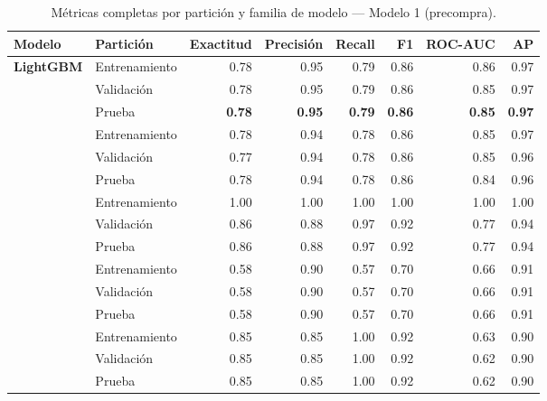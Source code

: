 \documentclass[11pt,letterpaper]{article}
\begin{document}
\begin{table}[h!]
\centering
\footnotesize
\caption{Métricas completas por partición y familia de modelo --- Modelo 1 (precompra).}
\label{tab:full_m1}
\begin{tabular}{@{}llrrrrrr@{}}
\toprule
Modelo & Partición & Exactitud & Precisión & Recall & F1 & ROC-AUC & AP \\
\midrule
\multirow{3}{*}{\textbf{LightGBM}}
  & Entrenamiento & 0.78 & 0.95 & 0.79 & 0.86 & 0.86 & 0.97 \\
  & Validación    & 0.78 & 0.95 & 0.79 & 0.86 & 0.85 & 0.97 \\
  & Prueba        & \textbf{0.78} & \textbf{0.95} & \textbf{0.79} & \textbf{0.86} & \textbf{0.85} & \textbf{0.97} \\
\addlinespace
\multirow{3}{*}{XGBoost}
  & Entrenamiento & 0.78 & 0.94 & 0.78 & 0.86 & 0.85 & 0.97 \\
  & Validación    & 0.77 & 0.94 & 0.78 & 0.86 & 0.85 & 0.96 \\
  & Prueba        & 0.78 & 0.94 & 0.78 & 0.86 & 0.84 & 0.96 \\
\addlinespace
\multirow{3}{*}{KNN}
  & Entrenamiento & 1.00 & 1.00 & 1.00 & 1.00 & 1.00 & 1.00 \\
  & Validación    & 0.86 & 0.88 & 0.97 & 0.92 & 0.77 & 0.94 \\
  & Prueba        & 0.86 & 0.88 & 0.97 & 0.92 & 0.77 & 0.94 \\
\addlinespace
\multirow{3}{*}{Regresión Logística}
  & Entrenamiento & 0.58 & 0.90 & 0.57 & 0.70 & 0.66 & 0.91 \\
  & Validación    & 0.58 & 0.90 & 0.57 & 0.70 & 0.66 & 0.91 \\
  & Prueba        & 0.58 & 0.90 & 0.57 & 0.70 & 0.66 & 0.91 \\
\addlinespace
\multirow{3}{*}{LDA}
  & Entrenamiento & 0.85 & 0.85 & 1.00 & 0.92 & 0.63 & 0.90 \\
  & Validación    & 0.85 & 0.85 & 1.00 & 0.92 & 0.62 & 0.90 \\
  & Prueba        & 0.85 & 0.85 & 1.00 & 0.92 & 0.62 & 0.90 \\
\bottomrule
\end{tabular}
\end{table}
\end{document}
